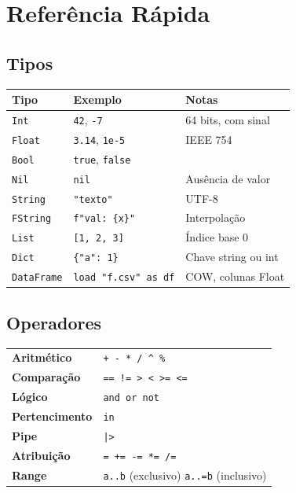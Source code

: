 \chapter{Referência Rápida}
\label{apendice:referencia}

\section{Tipos}

\begin{center}
\begin{tabular}{lll}
\toprule
\textbf{Tipo} & \textbf{Exemplo} & \textbf{Notas} \\
\midrule
\texttt{Int}       & \texttt{42}, \texttt{-7}      & 64 bits, com sinal \\
\texttt{Float}     & \texttt{3.14}, \texttt{1e-5}  & IEEE 754 \\
\texttt{Bool}      & \texttt{true}, \texttt{false} & \\
\texttt{Nil}       & \texttt{nil}                  & Ausência de valor \\
\texttt{String}    & \texttt{"texto"}              & UTF-8 \\
\texttt{FString}   & \texttt{f"val: \{x\}"}        & Interpolação \\
\texttt{List}      & \texttt{[1, 2, 3]}            & Índice base 0 \\
\texttt{Dict}      & \texttt{\{"a": 1\}}           & Chave string ou int \\
\texttt{DataFrame} & \texttt{load "f.csv" as df}   & COW, colunas Float \\
\bottomrule
\end{tabular}
\end{center}

\section{Operadores}

\begin{center}
\begin{tabular}{ll}
\toprule
\textbf{Aritmético}    & \texttt{+  -  *  /  \^{}  \%} \\
\textbf{Comparação}    & \texttt{== != > < >= <=} \\
\textbf{Lógico}        & \texttt{and  or  not} \\
\textbf{Pertencimento} & \texttt{in} \\
\textbf{Pipe}          & \texttt{|>} \\
\textbf{Atribuição}    & \texttt{=  +=  -=  *=  /=} \\
\textbf{Range}         & \texttt{a..b} (exclusivo) \quad \texttt{a..=b} (inclusivo) \\
\bottomrule
\end{tabular}
\end{center}

